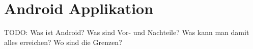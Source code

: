 \section{Android Applikation}
\label{sec:android}

TODO: Was ist Android? Was sind Vor- und Nachteile? Was kann man damit alles
	erreichen? Wo sind die Grenzen?
